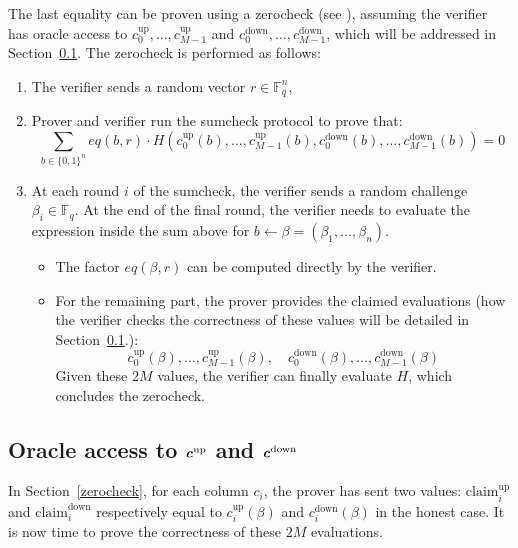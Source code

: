 \documentclass{article}
\newcommand{\Fq}{\mathbb F_q}
\begin{document}
The last equality can be proven using a zerocheck (see \cite{hyperplonk}), assuming the verifier has oracle access to $c_0^{\text{up}}, \dots, c_{M-1}^{\text{up}}$ and $ c_0^{\text{down}}, \dots, c_{M-1}^{\text{down}}$, which will be addressed in Section~\ref{shifted_mle}. The zerocheck is performed as follows:

\begin{enumerate}
    \item The verifier sends a random vector $r \in \Fq^n$,
    \item Prover and verifier run the sumcheck protocol to prove that:
    $$ \sum_{b \in \{0, 1\}^n} eq(b, r) \cdot H(c_0^{\text{up}}(b), \dots, c_{M-1}^{\text{up}}(b), c_0^{\text{down}}(b), \dots, c_{M-1}^{\text{down}}(b)) = 0 $$
    \item At each round $i$ of the sumcheck, the verifier sends a random challenge $\beta_i \in \Fq$. At the end of the final round, the verifier needs to evaluate the expression inside the sum above for $b \xleftarrow{} \beta = (\beta_1, \dots, \beta_n)$.
    \begin{itemize}
        \item The factor $eq(\beta, r)$ can be computed directly by the verifier.
        \item For the remaining part, the prover provides the claimed evaluations (how the verifier checks the correctness of these values will be detailed in Section~\ref{shifted_mle}.):
        \begin{equation*}
            c_0^{\text{up}}(\beta), \dots, c_{M-1}^{\text{up}}(\beta), \quad c_0^{\text{down}}(\beta), \dots, c_{M-1}^{\text{down}}(\beta)
        \end{equation*}
        Given these $2M$ values, the verifier can finally evaluate $H$, which concludes the zerocheck.
    \end{itemize}
\end{enumerate}

\subsection{Oracle access to \texorpdfstring{$\textbf{\textit{c}}^{\text{up}}$}{} and \texorpdfstring{$\textbf{\textit{c}}^{\text{down}}$}{}}\label{shifted_mle}

In Section~\ref{zerocheck}, for each column $c_i$, the prover has sent two values: $\text{claim}^\text{up}_i$ and $\text{claim}^\text{down}_i$ respectively equal to $c_i^{\text{up}}(\beta)$ and $c_i^{\text{down}}(\beta)$ in the honest case. It is now time to prove the correctness of these $2M$ evaluations.
\end{document}
